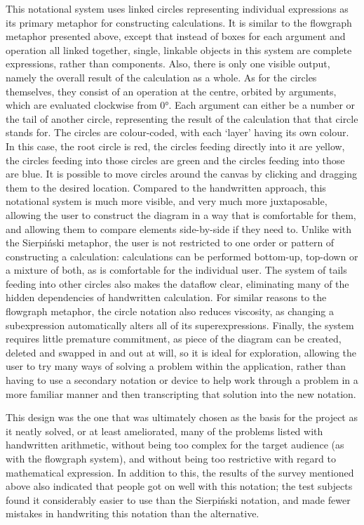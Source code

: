 \documentclass[12pt,twoside,notitlepage,xetex]{report}
\begin{document}
This notational system uses linked circles representing individual expressions
as its primary metaphor for constructing calculations.  It is similar to the
flowgraph metaphor presented above, except that instead of boxes for each
argument and operation all linked together, single, linkable objects in this
system are complete expressions, rather than components.  Also, there is only
one visible output, namely the overall result of the calculation as a whole.
As for the circles themselves, they consist of an operation at the centre,
orbited by arguments, which are evaluated clockwise from 0°.  Each argument can
either be a number or the tail of another circle, representing the result of
the calculation that that circle stands for.  The circles are colour-coded,
with each `layer' having its own colour.  In this case, the root circle is red,
the circles feeding directly into it are yellow, the circles feeding into those
circles are green and the circles feeding into those are blue.  It is possible
to move circles around the canvas by clicking and dragging them to the desired
location.  Compared to the handwritten approach, this notational system is much
more visible, and very much more juxtaposable, allowing the user to construct
the diagram in a way that is comfortable for them, and allowing them to compare
elements side-by-side if they need to.  Unlike with the Sierpiński metaphor,
the user is not restricted to one order or pattern of constructing a
calculation: calculations can be performed bottom-up, top-down or a mixture of
both, as is comfortable for the individual user.  The system of tails feeding
into other circles also makes the dataflow clear, eliminating many of the
hidden dependencies of handwritten calculation.  For similar reasons to the
flowgraph metaphor, the circle notation also reduces viscosity, as changing a
subexpression automatically alters all of its superexpressions.  Finally, the
system requires little premature commitment, as piece of the diagram can be
created, deleted and swapped in and out at will, so it is ideal for
exploration, allowing the user to try many ways of solving a problem within the
application, rather than having to use a secondary notation or device to help
work through a problem in a more familiar manner and then transcripting that
solution into the new notation.

This design was the one that was ultimately chosen as the basis for the project
as it neatly solved, or at least ameliorated, many of the problems listed with
handwritten arithmetic, without being too complex for the target audience (as
with the flowgraph system), and without being too restrictive with regard to
mathematical expression.  In addition to this, the results of the survey
mentioned above also indicated that people got on well with this notation; the
test subjects found it considerably easier to use than the Sierpiński notation,
and made fewer mistakes in handwriting this notation than the alternative.
\end{document}
